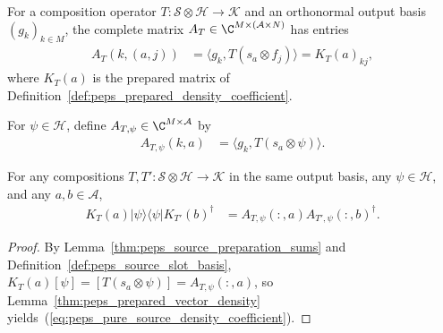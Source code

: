 \begin{definition}
    \label{def:peps_free_source_matrix}
    \leanok
    For a composition operator $T:\mathcal S\otimes\mathcal H\to\mathcal K$ and
    an orthonormal output basis $(g_k)_{k\in M}$, the complete matrix
    $A_T\in\C^{M\times(\mathcal A\times N)}$ has entries
    \begin{align}
        A_T(k,(a,j)) & =\langle g_k,T(s_a\otimes f_j)\rangle
        =K_T(a)_{kj},
        \label{eq:peps_free_source_matrix}
    \end{align}
    where $K_T(a)$ is the prepared matrix of
    Definition~\ref{def:peps_prepared_density_coefficient}.
\end{definition}

\begin{definition}
    \label{def:peps_pure_source_matrix}
    \leanok
    For $\psi\in\mathcal H$, define $A_{T,\psi}\in\C^{M\times\mathcal A}$ by
    \begin{align}
        A_{T,\psi}(k,a)
         & =\langle g_k,T(s_a\otimes\psi)\rangle.
        \label{eq:peps_pure_source_matrix}
    \end{align}
\end{definition}

\begin{lemma}
    \label{thm:peps_pure_source_density_coefficient}
    \leanok
    For any compositions $T,T':\mathcal S\otimes\mathcal H\to\mathcal K$ in the
    same output basis, any $\psi\in\mathcal H$, and any $a,b\in\mathcal A$,
    \begin{align}
        K_T(a)|\psi\rangle\langle\psi|K_{T'}(b)^\dagger
         & =A_{T,\psi}(:,a)A_{T',\psi}(:,b)^\dagger.
        \label{eq:peps_pure_source_density_coefficient}
    \end{align}
\end{lemma}

\begin{proof}\leanok
    By Lemma~\ref{thm:peps_source_preparation_sums} and
    Definition~\ref{def:peps_source_slot_basis},
    $K_T(a)[\psi]=[T(s_a\otimes\psi)]=A_{T,\psi}(:,a)$, so
    Lemma~\ref{thm:peps_prepared_vector_density} yields~(\ref{eq:peps_pure_source_density_coefficient}).
\end{proof}



